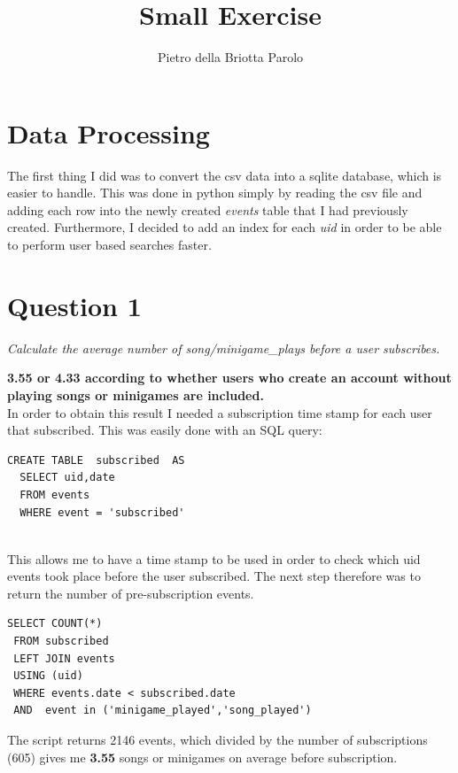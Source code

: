 \documentclass[paper=a4, fontsize=10pt]{report}
\title{Small Exercise}
\author{Pietro della Briotta Parolo}
\date{}
\begin{document}
\maketitle
\section*{Data Processing}

The first thing I did was to convert the csv data into a sqlite database, which is easier to handle. This was done in python
simply by reading the csv file and adding each row into the newly created \textit{events} table that I had previously created. Furthermore,
I decided to add an index for each \textit{uid} in order to be able to perform user based searches faster.

\section*{Question 1}

\textit{ Calculate the average number of song/minigame\_plays before a user 
subscribes.}

\textbf{3.55 or 4.33 according to whether users who create an account without playing songs or minigames are included.}\\

In order to obtain this result I needed a subscription time stamp for each user that subscribed. This was easily done with an SQL query:


\footnotesize
\begin{lstlisting}[frame=single,caption=Generate subscription table \label{code:sub_table}]
  CREATE TABLE  subscribed  AS
  SELECT uid,date
  FROM events
  WHERE event = 'subscribed'
        
\end{lstlisting} 
\normalsize

This allows me to have a time stamp to be used in order to check which uid events took place before the user subscribed. The next step therefore was to return the number of pre-subscription events.

\footnotesize
\begin{lstlisting}[frame=single,caption=Return pre-sub events \label{code:pre_sub_table}]
 SELECT COUNT(*) 
 FROM subscribed 
 LEFT JOIN events
 USING (uid)
 WHERE events.date < subscribed.date
 AND  event in ('minigame_played','song_played')
\end{lstlisting}
\normalsize

The script returns 2146 events, which divided by the number of subscriptions (605) gives me
\textbf{3.55} songs or minigames on average before subscription.
\end{document}
